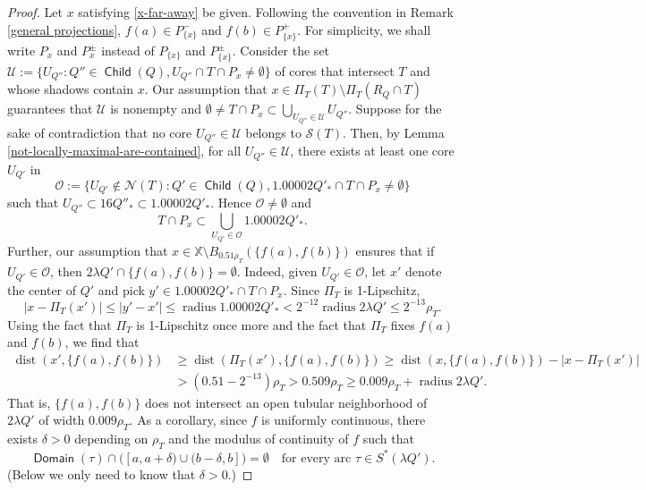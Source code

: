 \documentclass[12pt]{amsart}
\numberwithin{equation}{section}
\theoremstyle{plain}
\theoremstyle{definition}
\def\XX{{\mathbb{X}}}
\newcommand{\radius}{\mathop\mathrm{radius}\nolimits}
\newcommand{\dist}{\mathop\mathrm{dist}\nolimits}
\newcommand{\Domain}{\mathop\mathsf{Domain}\nolimits}
\newcommand{\Child}{\mathop\mathsf{Child}\nolimits}
\numberwithin{figure}{section}
\begin{document}
\begin{proof}Let $x$ satisfying \eqref{x-far-away} be given. Following the convention in Remark \ref{general projections}, $f(a)\in P_{\{x\}}^-$ and $f(b)\in P_{\{x\}}^+$. For simplicity, we shall write $P_x$ and $P^\pm_x$ instead of $P_{\{x\}}$ and $P^\pm_{\{x\}}$. Consider the set $\mathcal{U}:=\{U_{Q''}:Q''\in\Child(Q), U_{Q''}\cap T\cap P_{x}\neq\emptyset\}$ of cores that intersect $T$ and whose shadows contain $x$. Our assumption that $x\in\Pi_T(T)\setminus \Pi_T(R_Q\cap T)$ guarantees that $\mathcal{U}$ is nonempty and $\emptyset\neq T\cap P_x\subset \bigcup_{U_{Q''}\in\mathcal{U}} U_{Q''}$. Suppose for the sake of contradiction that no core $U_{Q''}\in\mathcal{U}$ belongs to $\mathcal{S}(T)$. Then, by Lemma \ref{not-locally-maximal-are-contained}, for all $U_{Q''}\in\mathcal{U}$, there exists at least one core $U_{Q'}$ in $$\mathcal{O}:=\{U_{Q'}\not\in\mathcal{N}(T):Q'\in\Child(Q),1.00002Q'_*\cap T\cap P_x\neq\emptyset\}$$ such that $U_{Q''}\subset 16Q''_*\subset 1.00002Q'_*$. Hence $\mathcal{O}\neq\emptyset$ and \begin{equation}\label{O-cover} T\cap P_x\subset \bigcup_{U_{Q'}\in\mathcal{O}}1.00002Q'_*.\end{equation} Further,
our assumption that $x\in \XX\setminus B_{0.51\rho_T}(\{f(a),f(b)\})$ ensures that if $U_{Q'}\in\mathcal{O}$, then $2\lambda Q'\cap\{f(a),f(b)\}=\emptyset$. Indeed, given $U_{Q'}\in\mathcal{O}$, let $x'$ denote the center of $Q'$ and pick $y'\in 1.00002Q'_*\cap T\cap P_x$. Since $\Pi_T$ is 1-Lipschitz, $$|x-\Pi_T(x')|\leq |y'-x'|\leq \radius 1.00002Q'_*<2^{-12}\radius 2\lambda Q'\leq 2^{-13}\rho_T.$$ Using the fact that $\Pi_T$ is 1-Lipschitz once more and the fact that $\Pi_T$ fixes $f(a)$ and $f(b)$, we find that \begin{align*}\dist(x',\{f(a),f(b)\})&\geq \dist(\Pi_T(x'),\{f(a),f(b)\}) \geq \dist(x,\{f(a),f(b)\})-|x-\Pi_T(x')|\\ &>(0.51-2^{-13})\rho_T>0.509\rho_T\geq 0.009\rho_T+\radius 2\lambda Q'.\end{align*} That is, $\{f(a),f(b)\}$ does not intersect an open tubular neighborhood of $2\lambda Q'$ of width $0.009\rho_T$. As a corollary, since $f$ is uniformly continuous, there exists $\delta>0$ depending on $\rho_T$ and the modulus of continuity of $f$ such that \begin{equation}\label{domain-gap}\Domain(\tau)\cap\big([a,a+\delta)\cup(b-\delta,b]\big)=\emptyset\quad\text{for every arc }\tau\in S^*(\lambda Q').\end{equation} (Below we only need to know that $\delta>0$.)

\end{proof}
\end{document}

